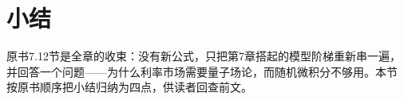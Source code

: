 \section{小结}

原书7.12节是全章的收束：没有新公式，只把第7章搭起的模型阶梯重新串一遍，
并回答一个问题——为什么利率市场需要量子场论，而随机微积分不够用。本节
按原书顺序把小结归纳为四点，供读者回查前文。

